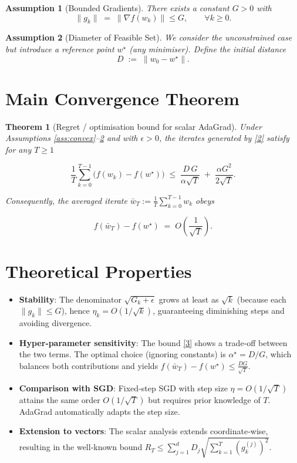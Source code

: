 \documentclass{article}
\newtheorem{theorem}{Theorem}
\newtheorem{assumption}{Assumption}
\begin{document}
\begin{assumption}[Bounded Gradients]\label{ass:bounded}
There exists a constant \(G>0\) with
\[
\|g_{k}\| \;=\;\|\nabla f(w_{k})\|\le G ,\qquad \forall k\ge0 .
\tag{A3}
\]
\end{assumption}

\begin{assumption}[Diameter of Feasible Set]\label{ass:diameter}
We consider the unconstrained case but introduce a reference point
\(w^{\star}\) (any minimiser). Define the initial distance
\[
D \;:=\;\|w_{0}-w^{\star}\| .
\tag{A4}
\]
\end{assumption}

\section*{Main Convergence Theorem}
\begin{theorem}[Regret / optimisation bound for scalar AdaGrad]\label{thm:main}
Under Assumptions \ref{ass:convex}--\ref{ass:diameter} and with
\(\epsilon>0\), the iterates generated by \eqref{2} satisfy for any
\(T\ge1\)

\[
\frac{1}{T}\sum_{k=0}^{T-1}\bigl(f(w_{k})-f(w^{\star})\bigr)
\;\le\;
\frac{D\,G}{\alpha\sqrt{T}} \;+\;
\frac{\alpha G^{2}}{2\sqrt{T}} .
\tag{3}
\]

Consequently, the averaged iterate
\(\displaystyle \bar w_{T}:=\frac{1}{T}\sum_{k=0}^{T-1}w_{k}\) obeys  

\[
f(\bar w_{T})-f(w^{\star})\;=\;O\!\left(\frac{1}{\sqrt{T}}\right).
\]
\end{theorem}

\section*{Theoretical Properties}
\begin{itemize}
\item \textbf{Stability}: The denominator \(\sqrt{G_{k}+\epsilon}\) grows at least as
\(\sqrt{k}\) (because each \(\|g_{k}\|\le G\)), hence \(\eta_{k}=O(1/\sqrt{k})\),
guaranteeing diminishing steps and avoiding divergence.
\item \textbf{Hyper‑parameter sensitivity}: The bound \eqref{3} shows a trade‑off
between the two terms. The optimal choice (ignoring constants) is
\(\alpha^{\star}=D/G\), which balances both contributions and yields
\(f(\bar w_{T})-f(w^{\star})\le \frac{DG}{\sqrt{T}}\).
\item \textbf{Comparison with SGD}: Fixed‑step SGD with step size
\(\eta=O(1/\sqrt{T})\) attains the same order \(O(1/\sqrt{T})\) but requires prior
knowledge of \(T\). AdaGrad automatically adapts the step size.
\item \textbf{Extension to vectors}: The scalar analysis extends coordinate‑wise,
resulting in the well‑known bound
\(\displaystyle R_{T}\le \sum_{j=1}^{d} D_{j}\sqrt{\sum_{k=1}^{T} (g_{k}^{(j)})^{2}}\).
\end{itemize}
\end{document}
